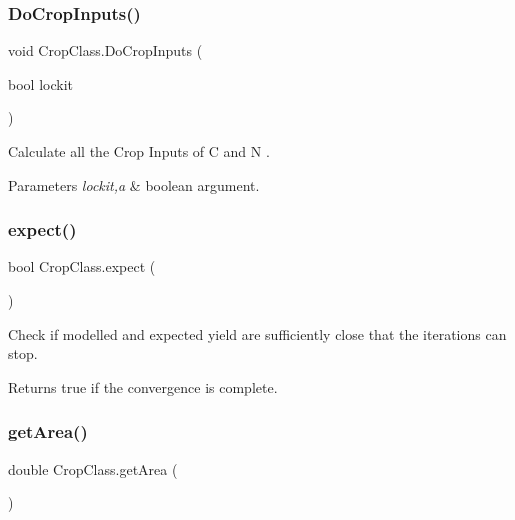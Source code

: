 \subsubsection{\texorpdfstring{DoCropInputs()}{DoCropInputs()}}
{\footnotesize\ttfamily void Crop\+Class.\+Do\+Crop\+Inputs (\begin{DoxyParamCaption}\item[{bool}]{lockit }\end{DoxyParamCaption})\hspace{0.3cm}{\ttfamily [inline]}}



Calculate all the Crop Inputs of C and N . 


\begin{DoxyParams}{Parameters}
{\em lockit,a} & boolean argument. \\
\hline
\end{DoxyParams}
\mbox{\label{class_crop_class_a66d5088950904f3c70f57202f27ceead}} 
\subsubsection{\texorpdfstring{expect()}{expect()}}
{\footnotesize\ttfamily bool Crop\+Class.\+expect (\begin{DoxyParamCaption}{ }\end{DoxyParamCaption})\hspace{0.3cm}{\ttfamily [inline]}}



Check if modelled and expected yield are sufficiently close that the iterations can stop. 

\begin{DoxyReturn}{Returns}
true if the convergence is complete. 
\end{DoxyReturn}
\mbox{\label{class_crop_class_a77a58c3801353024b26306dc3d170751}} 
\subsubsection{\texorpdfstring{getArea()}{getArea()}}
{\footnotesize\ttfamily double Crop\+Class.\+get\+Area (\begin{DoxyParamCaption}{ }\end{DoxyParamCaption})\hspace{0.3cm}{\ttfamily [inline]}}



